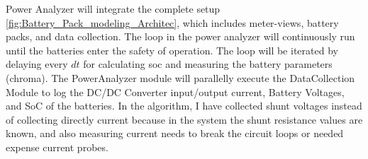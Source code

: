 Power Analyzer will integrate the complete setup \ref{fig:Battery_Pack_modeling_Architec}, which includes meter-views, battery packs, and data collection.  The loop in the power analyzer will continuously run until the batteries enter the safety of operation. The loop will be iterated by delaying every $dt$ for calculating soc and measuring the battery parameters (chroma).
The PowerAnalyzer module will parallelly execute the DataCollection Module to log the DC/DC Converter input/output current, Battery Voltages, and SoC of the batteries. In the algorithm, I have collected shunt voltages instead of collecting directly current because in the system the shunt resistance values are known, and also measuring current needs to break the circuit loops or needed expense current probes.

